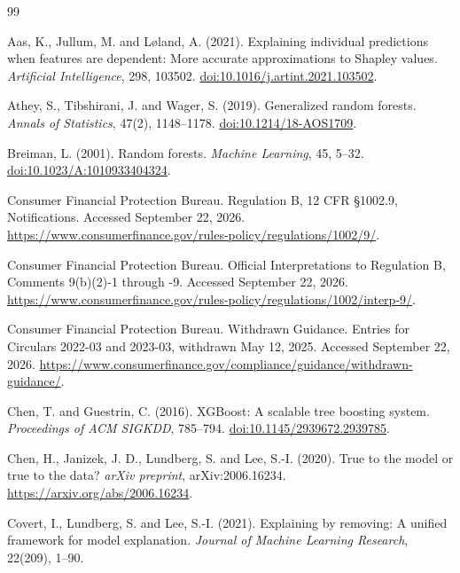 \begin{thebibliography}{99}

Aas, K., Jullum, M. and L{\o}land, A. (2021). Explaining individual predictions when features are
dependent: More accurate approximations to Shapley values. \emph{Artificial Intelligence}, 298, 103502.
\href{https://doi.org/10.1016/j.artint.2021.103502}{doi:10.1016/j.artint.2021.103502}.

Athey, S., Tibshirani, J. and Wager, S. (2019). Generalized random forests.
\emph{Annals of Statistics}, 47(2), 1148--1178.
\href{https://doi.org/10.1214/18-AOS1709}{doi:10.1214/18-AOS1709}.

Breiman, L. (2001). Random forests. \emph{Machine Learning}, 45, 5--32.
\href{https://doi.org/10.1023/A:1010933404324}{doi:10.1023/A:1010933404324}.

Consumer Financial Protection Bureau. Regulation B, 12 CFR \S1002.9, Notifications.
Accessed September 22, 2026.
\url{https://www.consumerfinance.gov/rules-policy/regulations/1002/9/}.

Consumer Financial Protection Bureau. Official Interpretations to Regulation B,
Comments 9(b)(2)-1 through -9. Accessed September 22, 2026.
\url{https://www.consumerfinance.gov/rules-policy/regulations/1002/interp-9/}.

Consumer Financial Protection Bureau. Withdrawn Guidance. Entries for Circulars
2022-03 and 2023-03, withdrawn May 12, 2025. Accessed September 22, 2026.
\url{https://www.consumerfinance.gov/compliance/guidance/withdrawn-guidance/}.

Chen, T. and Guestrin, C. (2016). XGBoost: A scalable tree boosting system.
\emph{Proceedings of ACM SIGKDD}, 785--794.
\href{https://doi.org/10.1145/2939672.2939785}{doi:10.1145/2939672.2939785}.

Chen, H., Janizek, J. D., Lundberg, S. and Lee, S.-I. (2020). True to the model or true to the data?
\emph{arXiv preprint}, arXiv:2006.16234.
\url{https://arxiv.org/abs/2006.16234}.

Covert, I., Lundberg, S. and Lee, S.-I. (2021). Explaining by removing: A unified framework for
model explanation. \emph{Journal of Machine Learning Research}, 22(209), 1--90.


\end{thebibliography}
